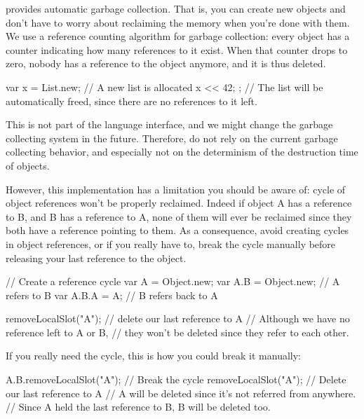 \us provides automatic garbage collection. That is, you can create new
objects and don't have to worry about reclaiming the memory when you're done
with them. We use a reference counting algorithm for garbage collection:
every object has a counter indicating how many references to it exist. When
that counter drops to zero, nobody has a reference to the object anymore,
and it is thus deleted.

\begin{urbiunchecked}
{
  var x = List.new; // A new list is allocated
  x << 42;
};
// The list will be automatically freed, since there are no references to it left.
\end{urbiunchecked}

This is not part of the language interface, and we might change the garbage
collecting system in the future. Therefore, do not rely on the current
garbage collecting behavior, and especially not on the determinism of the
destruction time of objects.

However, this implementation has a limitation you should be aware of: cycle
of object references won't be properly reclaimed. Indeed if object A has a
reference to B, and B has a reference to A, none of them will ever be
reclaimed since they both have a reference pointing to them. As a
consequence, avoid creating cycles in object references, or if you really
have to, break the cycle manually before releasing your last reference to
the object.

\begin{urbiunchecked}
// Create a reference cycle
var A = Object.new;
var A.B = Object.new; // A refers to B
var A.B.A = A; // B refers back to A

removeLocalSlot("A"); // delete our last reference to A
// Although we have no reference left to A or B,
// they won't be deleted since they refer to each other.
\end{urbiunchecked}

If you really need the cycle, this is how you could break it manually:

\begin{urbiunchecked}
A.B.removeLocalSlot("A"); // Break the cycle
removeLocalSlot("A"); // Delete our last reference to A
// A will be deleted since it's not referred from anywhere.
// Since A held the last reference to B, B will be deleted too.
\end{urbiunchecked}

